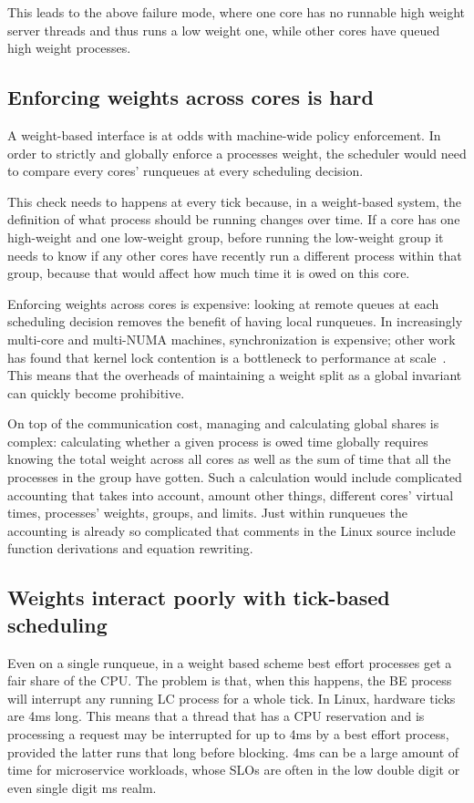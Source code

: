 This leads to the above failure mode, where one core has no runnable high weight
server threads and thus runs a low weight one, while other cores have queued
high weight processes.

\subsection{Enforcing weights across cores is
hard}\label{ss:problem:cross-core-hard}

A weight-based interface is at odds with machine-wide policy enforcement. In
order to strictly and globally enforce a processes weight, the scheduler would
need to compare every cores' runqueues at every scheduling decision. 

This check needs to happens at every tick because, in a weight-based system, the
definition of what process should be running changes over time. If a core has
one high-weight and one low-weight group, before running the low-weight group it
needs to know if any other cores have recently run a different process within
that group, because that would affect how much time it is owed on this core.

Enforcing weights across cores is expensive: looking at remote
queues at each scheduling decision removes the benefit of having local
runqueues. In increasingly multi-core and multi-NUMA machines, synchronization
is expensive; other work has found that kernel lock contention is a bottleneck
to performance at scale~\cite{afaas}. This means that the overheads of
maintaining a weight split as a global invariant can quickly become prohibitive.

On top of the communication cost, managing and calculating global shares is
complex: calculating whether a given process is owed time globally requires
knowing the total weight across all cores as well as the sum of time that all
the processes in the group have gotten. Such a calculation would include
complicated accounting that takes into account, amount other things, different
cores' virtual times, processes' weights, groups, and limits. Just within
runqueues the accounting is already so complicated that comments in the Linux
source include function derivations and equation rewriting.


\subsection{Weights interact poorly with tick-based
scheduling}\label{ss:problem:quantum}

Even on a single runqueue, in a weight based scheme best effort processes get a
fair share of the CPU. The problem is that, when this happens, the BE process
will interrupt any running LC process for a whole tick. In Linux, hardware ticks
are 4ms long. This means that a thread that has a CPU reservation and is
processing a request may be interrupted for up to 4ms by a best effort process,
provided the latter runs that long before blocking. 4ms can be a large amount of
time for microservice workloads, whose SLOs are often in the low double digit or
even single digit ms realm.~\cite{in-the-plex, sigmaos}



